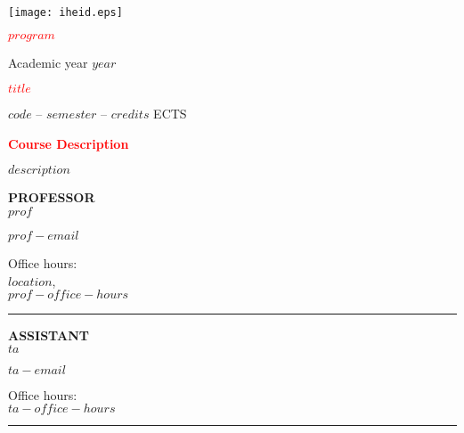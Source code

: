 \documentclass[11pt,a4paper]{article}
\author{$prof$}
\begin{document}
	

\hspace*{-1.25cm}
\texttt{[image: iheid.eps]}
\vspace{0.25cm}


\begin{minipage}[t][98mm][t]{0.60\textwidth}
\textbf{\textcolor{red}{$program$}}

Academic year $year$
\vspace{0.25cm}

\textbf{\textcolor{red}{$title$}}

$code$ -- $semester$ -- $credits$ ECTS
\vspace{0.25cm}

\textbf{\textcolor{red}{Course Description}}

$description$
\vspace{0.25cm}
	\end{minipage}%
	\hspace{0.5cm}\vrule{}\hspace{0.5cm}
	\begin{minipage}[t][95mm][t]{0.30\textwidth}
	\begin{minipage}[t][37mm][t]{\textwidth}
	\textbf{PROFESSOR}\\
	
	$prof$
	
	\vspace{0.1cm}
	$prof-email$
	\vspace{0.1cm}
	
Office hours: \\
$location$,\\
$prof-office-hours$
	
	\end{minipage}
	\vspace{1cm}\hrule{}\vspace{0.5cm}
	\begin{minipage}[t][38mm][t]{\textwidth}
	\textbf{ASSISTANT}\\
	
	$ta$

	\vspace{0.1cm}
	$ta-email$
	\vspace{0.1cm}

Office hours: \\
$ta-office-hours$

	\end{minipage}
	\end{minipage}
	\hrule{}
	\vspace{0.5cm}
	
\end{document}
